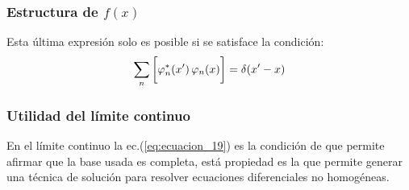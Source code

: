 \documentclass[12pt]{beamer}
\begin{document}
\begin{frame}
\frametitle{Estructura de $f(x)$}
Esta última expresión solo es posible si se satisface la condición:
\begin{align}
\sum_{n} \bigg[ \varphi_{n}^{*}({x}^{\prime}) \, \varphi_{n}(x) \bigg] = \delta({x}^{\prime} - x)
\label{eq:ecuacion_20}
\end{align}
\end{frame}
\begin{frame}
\frametitle{Utilidad del límite continuo}
En el límite continuo la ec.(\ref{eq:ecuacion_19}) es la condición de que permite afirmar que la base usada es completa, está propiedad es la que permite generar una técnica de solución para resolver ecuaciones diferenciales no homogéneas.
\end{frame}
\end{document}
